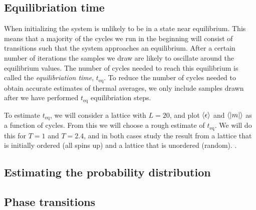 \subsection{Equilibriation time}\label{subsec_methods:equilibriation_time}
When initializing the system is unlikely to be in a state near equilibrium. This means that a majority of the cycles we run in the beginning will consist of transitions such that the system approaches an equilibrium. After a certain number of iterations the samples we draw are likely to oscillate around the equilibrium values. The number of cycles needed to reach this equilibrium is called the \textit{equilibriation time}, $t_\mathrm{eq}$. To reduce the number of cycles needed to obtain accurate estimates of thermal averages, we only include samples drawn after we have performed $t_\mathrm{eq}$ equilibriation steps. 

To estimate $t_\mathrm{eq}$, we will consider a lattice with $L=20$, and plot $\expval{\epsilon}$ and $\expval{\abs{m}}$ as a function of cycles. From this we will choose a rough estimate of $t_\mathrm{eq}$. We will do this for $T=1$ and $T=2.4$, and in both cases study the result from a lattice that is initially ordered (all spins up) and a lattice that is unordered (random). . 


\subsection{Estimating the probability distribution}\label{subsec_methods:histogram}



\subsection{Phase transitions}\label{subsec_methods:PT}